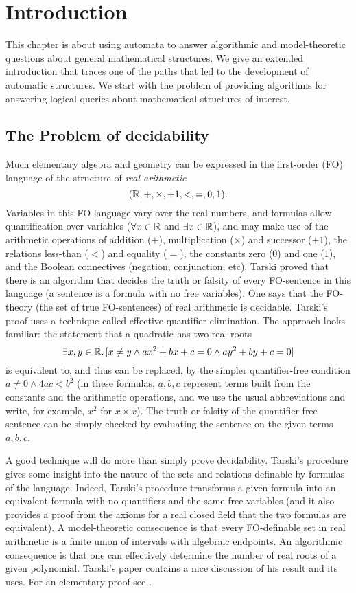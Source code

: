\section{Introduction} \label{AS:sec:introduction}

This chapter is about using automata to answer algorithmic and model-theoretic questions about general mathematical structures.
We give an extended introduction that traces one of the paths that led to the development of automatic structures. We start with
the problem of providing algorithms for answering logical queries about mathematical structures of interest.

\subsection{The Problem of decidability}
Much elementary algebra and geometry can be
expressed in the first-order (FO) language of the structure of {\em real arithmetic}
\[(\mathbb{R},+,\times,+1,<,=,0,1).\]
Variables in this FO language vary over the real numbers, and formulas allow quantification over variables 
($\forall x \in \mathbb{R}$ and $\exists x \in \mathbb{R}$), and may make use of the arithmetic operations of addition ($+$), multiplication ($\times$) and successor ($+1$), the relations less-than ($<$) and equality ($=$), the constants zero ($0$) and one ($1$), and the Boolean connectives (negation, conjunction, etc).
Tarski proved that there is an algorithm that decides the truth or falsity of
every FO-sentence in this language (a sentence is a formula with no free variables). One says that the FO-theory (the set of true FO-sentences) of real arithmetic is decidable. Tarski's proof uses a technique called effective quantifier elimination. The approach looks familiar:
the statement that a quadratic has two real roots
\[
\exists x,y \in \mathbb{R}.\,  [x \neq y \wedge ax^2 + bx + c = 0 \wedge ay^2 + by + c =0]
\]
is equivalent to, and thus can be replaced, by the simpler quantifier-free condition
$a \neq 0 \wedge 4ac < b^2$ (in these formulas, $a,b,c$ represent terms built from the constants and the arithmetic operations, and 
we use the usual abbreviations and write, for example, $x^2$ for $x \times x$). The truth or falsity of the quantifier-free sentence
can be simply checked by evaluating the sentence on the given terms $a,b,c$.


A good technique will do more than simply prove decidability. Tarski's procedure gives
some insight into the nature of the sets and relations definable by
formulas of the language.  Indeed, Tarski's procedure transforms a given
formula into an equivalent formula with no quantifiers and the same
free variables (and it also provides a proof from the axioms for a real closed field that the two formulas are equivalent). 
A model-theoretic consequence is that every FO-definable set in real arithmetic is a finite union of intervals with algebraic endpoints. An algorithmic consequence
is that one can effectively determine the number of real roots of a given polynomial.
Tarski's paper \cite{Tars51} contains a nice discussion of his result
and its uses. For an elementary proof see \cite{MiOz02}.

